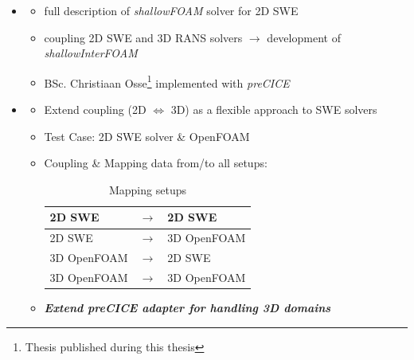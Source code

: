 \begin{frame}

\begin{multicols}{2}
\begin{itemize}
\item<1->[]    
 \begin{itemize}
   \setlength\itemsep{2em}
  \item  full description of \textit{shallowFOAM}  solver for 2D SWE \cite{mintgen}
 \item  coupling 2D SWE and 3D RANS solvers $\rightarrow$ development of \textit{shallowInterFOAM} \cite{mintgen}
 \item BSc. Christiaan Osse\footnote{Thesis published during this thesis} implemented \cite{mintgen} with \textit{preCICE}
 \end{itemize}
    
 \vfill\columnbreak

\item<2->[]
 \begin{itemize}
    \setlength\itemsep{2em}

 \item<3-> Extend \cite{mintgen} coupling (2D $\Longleftrightarrow$ 3D) as a flexible approach to SWE solvers
 \item<4-> Test Case: 2D SWE solver \& OpenFOAM 
 \item<5-> Coupling \& Mapping data from/to all setups: \vspace{0.4cm}
\begin{table}[]
\begin{tabular}{|lll|}
\hline
2D SWE       & $\rightarrow$ & 2D SWE       \\ \hline
2D SWE       & $\rightarrow$ & 3D OpenFOAM \\ \hline
3D OpenFOAM & $\rightarrow$ & 2D SWE       \\ \hline
3D OpenFOAM & $\rightarrow$ & 3D OpenFOAM \\ \hline
\end{tabular}
\caption{Mapping setups}
\label{table:1}
\end{table}
\item<6-> \textbf{\textit{Extend preCICE adapter for handling 3D domains}}
\end{itemize}
\end{itemize}
\end{multicols}


\end{frame}


